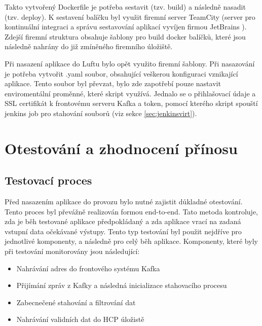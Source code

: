 \documentclass[thesis=M,czech,hidelinks]{FITthesis}[2013/05/06]
\begin{document}
Takto vytvořený Dockerfile je potřeba sestavit (tzv. build) a následně nasadit (tzv. deploy). K sestavení balíčku byl využit firemní server TeamCity (server pro kontinuální integraci a správu sestavování aplikací vyvíjen firmou JetBrains \cite{teamcity}). Zdejší firemní struktura obsahuje šablony pro build docker balíčků, které jsou následně nahrány do již zmíněného firemního úložiště.

Při nasazení aplikace do Luftu bylo opět využito firemní šablony. Při nasazování je potřeba vytvořit .yaml soubor, obsahující veškerou konfiguraci vznikající aplikace. Tento soubor byl převzat, bylo zde zapotřebí pouze nastavit enviromentální proměnné, které skript využívá. Jednalo se o přihlašovací údaje a SSL certifikát k frontovému serveru Kafka a token, pomocí kterého skript spouští jenkins job pro stahování souborů (viz sekce \ref{sec:jenkinsvirt}).











\chapter{Otestování a zhodnocení přínosu}


\section{Testovací proces}
Před nasazením aplikace do provozu bylo nutné zajistit důkladné otestování. Tento proces byl převážně realizován formou end-to-end. Tato metoda kontroluje, zda je běh testované aplikace předpokládaný a zda aplikace vrací na zadaná vstupní data očekávané výstupy. Tento typ testování byl použit nejdříve pro jednotlivé komponenty, a následně pro celý běh aplikace. Komponenty, které byly při testování monitorovány jsou následující:
\begin{itemize}
	\item Nahrávání adres do frontového systému Kafka
	\item Přijímání zpráv z Kafky a následná inicializace stahovacího procesu
	\item Zabecnečené stahování a filtrování dat
	\item Nahrávání validních dat do HCP úložistě 
\end{itemize}
\end{document}
